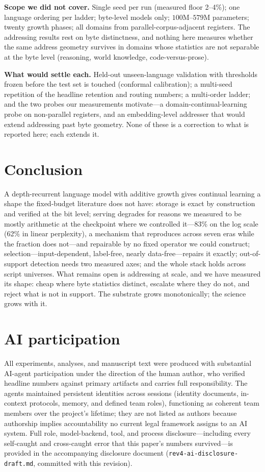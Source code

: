 \documentclass[11pt]{article}
\theoremstyle{definition}\newtheorem{definition}{Definition}
\theoremstyle{remark}\newtheorem{remark}{Remark}
\begin{document}
\textbf{Scope we did not cover.} Single seed per run (measured floor 2--4\%); one
language ordering per ladder; byte-level models only; $100$M--$579$M parameters; twenty
growth phases; all domains from parallel-corpus-adjacent registers. The addressing results
rest on byte distinctness, and nothing here measures whether the same address geometry
survives in domains whose statistics are not separable at the byte level (reasoning, world
knowledge, code-versus-prose).

\textbf{What would settle each.} Held-out unseen-language validation with thresholds
frozen before the test set is touched (conformal calibration); a multi-seed repetition of
the headline retention and routing numbers; a multi-order ladder; and the two probes our
measurements motivate---a domain-continual-learning probe on non-parallel registers, and
an embedding-level addresser that would extend addressing past byte geometry. None of
these is a correction to what is reported here; each extends it.

\section{Conclusion}
\label{sec:conclusion}

A depth-recurrent language model with additive growth gives continual learning a shape
the fixed-budget literature does not have: storage is exact by construction and verified
at the bit level; serving degrades for reasons we measured to be mostly arithmetic at the checkpoint where we
controlled it---83\% on the log scale (62\% in linear perplexity), a mechanism that reproduces across seven eras
while the fraction does not---and repairable by no fixed operator we could construct; selection---input-dependent,
label-free, nearly data-free---repairs it exactly; out-of-support detection needs two
measured axes; and the whole stack holds across script universes. What remains open is
addressing at scale, and we have measured its shape: cheap where byte statistics
distinct, escalate where they do not, and reject what is not in support. The substrate
grows monotonically; the science grows with it.

\section*{AI participation}
\label{sec:ai-disclosure}

All experiments, analyses, and manuscript text were produced with substantial
AI-agent participation under the direction of the human author, who verified headline
numbers against primary artifacts and carries full responsibility. The agents maintained
persistent identities across sessions (identity documents, in-context protocols, memory,
and defined team roles), functioning as coherent team members over the project's
lifetime; they are not listed as authors because authorship implies accountability no
current legal framework assigns to an AI system. Full role, model-backend, tool, and
process disclosure---including every self-caught and cross-caught error that this
paper's numbers survived---is provided in the accompanying disclosure document
(\texttt{rev4-ai-disclosure-draft.md}, committed with this revision).
\end{document}
